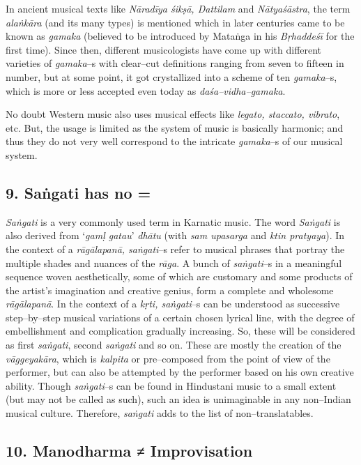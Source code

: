 In ancient musical texts like \textit{Nāradīya śikṣā, Dattilam} and \textit{Nātyaśāstra}, the term \textit{alaṅkāra} (and its many types) is mentioned which in later centuries came to be known as \textit{gamaka} (believed to be introduced by Mataṅga in his \textit{Bṛhaddeśī} for the first time). Since then, different musicologists have come up with different varieties of \textit{gamaka}–s with clear–cut definitions ranging from seven to fifteen in number, but at some point, it got crystallized into a scheme of ten \textit{gamaka}–s, which is more or less accepted even today as \textit{daśa–vidha–gamaka}.

No doubt Western music also uses musical effects like \textit{legato, staccato, vibrato}, etc. But, the usage is limited as the system of music is basically harmonic; and thus they do not very well correspond to the intricate \textit{gamaka}–s of our musical system.


\subsection*{9. Saṅgati has no =}

\textit{Saṅgati} is a very commonly used term in Karnatic music. The word \textit{Saṅgati} is also derived from ‘\textit{gamḷ gatau}’ \textit{dhātu} (with \textit{sam upasarga} and \textit{ktin pratyaya}). In the context of a \textit{rāgālapanā, saṅgati}–s refer to musical phrases that portray the multiple shades and nuances of the \textit{rāga}. A bunch of \textit{saṅgati}–s in a meaningful sequence woven aesthetically, some of which are customary and some products of the artist’s imagination and creative genius, form a complete and wholesome \textit{rāgālapanā}. In the context of a \textit{kṛti, saṅgati}–s can be understood as successive step–by–step musical variations of a certain chosen lyrical line, with the degree of embellishment and complication gradually increasing. So, these will be considered as first \textit{saṅgati}, second \textit{saṅgati} and so on. These are mostly the creation of the \textit{vāggeyakāra}, which is \textit{kalpita} or pre–composed from the point of view of the performer, but can also be attempted by the performer based on his own creative ability. Though \textit{saṅgati}–s can be found in Hindustani music to a small extent (but may not be called as such), such an idea is unimaginable in any non–Indian musical culture. Therefore, \textit{saṅgati} adds to the list of non–translatables.


\subsection*{10. Manodharma ≠ Improvisation}


